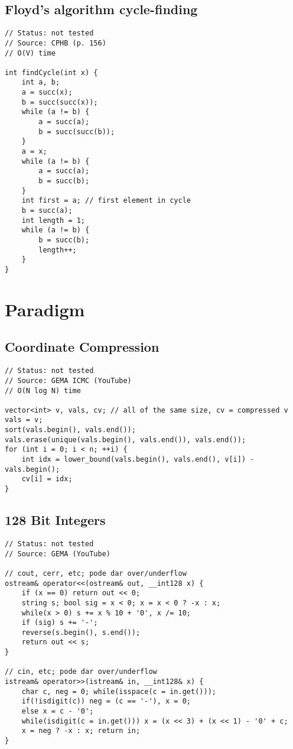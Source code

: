 \documentclass[12pt, a4paper, twoside]{article}
\begin{document}
\subsection{Floyd's algorithm cycle-finding}
\begin{lstlisting}
// Status: not tested
// Source: CPHB (p. 156)
// O(V) time

int findCycle(int x) {
	int a, b;
	a = succ(x);
	b = succ(succ(x));
	while (a != b) {
		a = succ(a);
		b = succ(succ(b));
	}
	a = x;
	while (a != b) {
		a = succ(a);
		b = succ(b);
	}
	int first = a; // first element in cycle
	b = succ(a);
	int length = 1;
	while (a != b) {
		b = succ(b);
		length++;
	}
}
\end{lstlisting}



\section{Paradigm}

\subsection{Coordinate Compression}
\begin{lstlisting}
// Status: not tested
// Source: GEMA ICMC (YouTube)
// O(N log N) time

vector<int> v, vals, cv; // all of the same size, cv = compressed v
vals = v;
sort(vals.begin(), vals.end());
vals.erase(unique(vals.begin(), vals.end()), vals.end());
for (int i = 0; i < n; ++i) {
	int idx = lower_bound(vals.begin(), vals.end(), v[i]) - vals.begin();
	cv[i] = idx;
}
\end{lstlisting}

\subsection{128 Bit Integers}
\begin{lstlisting}
// Status: not tested
// Source: GEMA (YouTube)

// cout, cerr, etc; pode dar over/underflow
ostream& operator<<(ostream& out, __int128 x) {
    if (x == 0) return out << 0;
    string s; bool sig = x < 0; x = x < 0 ? -x : x;
    while(x > 0) s += x % 10 + '0', x /= 10;
    if (sig) s += '-';
    reverse(s.begin(), s.end());
    return out << s;
}

// cin, etc; pode dar over/underflow
istream& operator>>(istream& in, __int128& x) {
    char c, neg = 0; while(isspace(c = in.get()));
    if(!isdigit(c)) neg = (c == '-'), x = 0;
    else x = c - '0';
    while(isdigit(c = in.get())) x = (x << 3) + (x << 1) - '0' + c;
    x = neg ? -x : x; return in;
}
\end{lstlisting}
\end{document}
